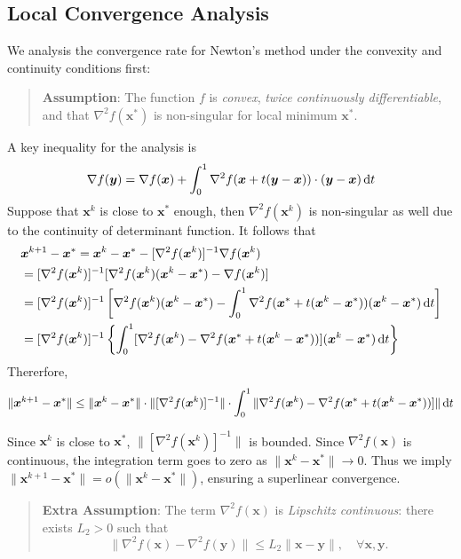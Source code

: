 \subsection{Local Convergence Analysis}
We analysis the convergence rate for Newton's method under the convexity and continuity conditions first:
\begin{quotation}
\textbf{Assumption}:
The function $f$ is \emph{convex}, \emph{twice continuously differentiable}, and that $\nabla^2f(\bm x^*)$ is non-singular for local minimum $\bm x^*$.
\end{quotation}
A key inequality for the analysis is
\[
\nabla f(\bm y) = \nabla f(\bm x) + \int_0^1\nabla^2f(\bm x+t(\bm y - \bm x))\cdot(\bm y-\bm x)\,\mathrm{d} t
\]
Suppose that $\bm x^k$ is close to $\bm x^*$ enough, then $\nabla^2f(\bm x^k)$ is non-singular as well due to the continuity of determinant function. It follows that
\begin{subequations}
\begin{align*}
&\bm x^{k+1} - \bm x^* = \bm x^k - \bm x^* - [\nabla^2f(\bm x^k)]^{-1}\nabla f(\bm x^k)\\
&=[\nabla^2f(\bm x^k)]^{-1} [\nabla^2f(\bm x^k)(\bm x^k - \bm x^*) - \nabla f(\bm x^k)]\\
&=[\nabla^2f(\bm x^k)]^{-1} \left[\nabla^2f(\bm x^k)(\bm x^k - \bm x^*) - \int_0^1\nabla^2f(\bm x^* + t(\bm x^k - \bm x^*)) (\bm x^k-\bm x^*)\,\mathrm{d} t\right]\\
&=[\nabla^2f(\bm x^k)]^{-1}
\left\{
\int_0^1
[\nabla^2f(\bm x^k) - \nabla^2f(\bm x^* + t(\bm x^k - \bm x^*))]
(\bm x^k-\bm x^*)\,\mathrm{d} t
\right\}
\end{align*}
\end{subequations}
Thererfore,
\[
\|\bm x^{k+1} - \bm x^*\|
\le
\|\bm x^{k} - \bm x^*\|
\cdot
\|[\nabla^2f(\bm x^k)]^{-1}\|
\cdot
\int_0^1
\|\nabla^2f(\bm x^k) - \nabla^2f(\bm x^* + t(\bm x^k - \bm x^*))]\|\,\mathrm{d} t
\]

Since $\bm x^k$ is close to $\bm x^*$, $\|[\nabla^2f(\bm x^k)]^{-1}\|$ is bounded. Since $\nabla^2f(\bm x)$ is continuous, the integration term goes to zero as $\|\bm x^k - \bm x^*\|\to0$. Thus we imply $\|\bm x^{k+1} - \bm x^*\| = o(\|\bm x^k - \bm x^*\|)$, ensuring a superlinear convergence.

\begin{quotation}
\textbf{Extra Assumption}:
The term $\nabla^2f(\bm x)$ is \emph{Lipschitz continuous}: there exists $L_2>0$ such that
\[
\|\nabla^2f(\bm x) - \nabla^2 f(\bm y)\|\le L_2\|\bm x-\bm y\|,\quad \forall \bm x,\bm y.
\]
\end{quotation}

